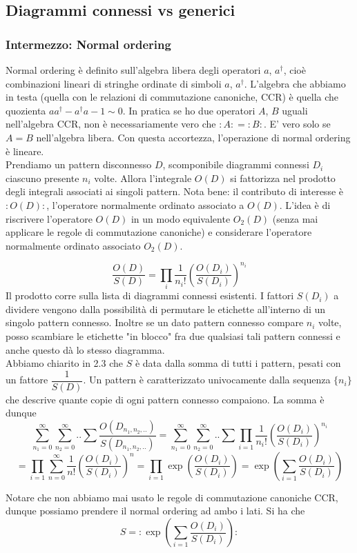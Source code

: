 \documentclass[]{article}
\begin{document}
\subsection{Diagrammi connessi vs generici}
\subsubsection*{Intermezzo: Normal ordering}
Normal ordering è definito sull'algebra libera degli operatori $a$, $a^\dagger$, cioè combinazioni lineari di stringhe ordinate di simboli $a$, $a^\dagger$. L'algebra che abbiamo in testa (quella con le relazioni di commutazione canoniche, CCR) è quella che quozienta $aa^\dagger-a^\dagger a -1 \sim 0$. In pratica se ho due operatori $A$, $B$ uguali nell'algebra CCR, non è necessariamente vero che $:A: = :B:$. E' vero solo se $A=B$ nell'algebra libera. Con questa accortezza, l'operazione di normal ordering è lineare.
\\

Prendiamo un pattern disconnesso $D$, scomponibile diagrammi connessi $D_i$ ciascuno presente $n_i$ volte. Allora l'integrale $O(D)$ si fattorizza nel prodotto degli integrali associati ai singoli pattern. Nota bene: il contributo di interesse è $:O(D):$, l'operatore normalmente ordinato associato a $O(D)$. L'idea è di riscrivere l'operatore $O(D)$ in un modo equivalente $O_2(D)$ (senza mai applicare le regole di commutazione canoniche) e considerare l'operatore normalmente ordinato associato $O_2(D)$.

\[ \dfrac{O(D)}{S(D)} = \prod_i \frac{1}{n_i!} \left( \dfrac{O(D_i)}{S(D_i)} \right)^{n_i} \]
Il prodotto corre sulla lista di diagrammi connessi esistenti. I fattori $S(D_i)$ a dividere vengono dalla possibilità di permutare le etichette all'interno di un singolo pattern connesso. Inoltre se un dato pattern connesso compare $n_i$ volte, posso scambiare le etichette "in blocco" fra due qualsiasi tali pattern connessi e anche questo dà lo stesso diagramma.
\\
Abbiamo chiarito in 2.3 che $S$ è data dalla somma di tutti i pattern, pesati con un fattore $\dfrac{1}{S(D)}$. Un pattern è caratterizzato univocamente dalla sequenza $\{n_i\}$ che descrive quante copie di ogni pattern connesso compaiono. La somma è dunque
\[ \sum_{n_1 = 0}^{\infty} \sum_{n_2 = 0}^{\infty} .. \sum \dfrac{O(D_{n_1,n_2,..})}{S(D_{n_1,n_2,..})} = \sum_{n_1 = 0}^{\infty} \sum_{n_2 = 0}^{\infty} .. \sum \prod_{i=1} \dfrac{1}{n_i!} \left( \dfrac{O(D_i)}{S(D_i)} \right)^{n_i} \]
\[ = \prod_{i=1} \sum_{n=0}^{\infty} \dfrac{1}{n!} \left( \dfrac{O(D_i)}{S(D_i)} \right)^{n} = \prod_{i=1} \exp\left( \dfrac{O(D_i)}{S(D_i)} \right) = \exp\left( \sum_{i=1} \dfrac{O(D_i)}{S(D_i)} \right) \]

Notare che non abbiamo mai usato le regole di commutazione canoniche CCR, dunque possiamo prendere il normal ordering ad ambo i lati. Si ha che
\[ S = :\exp\left( \sum_{i=1} \dfrac{O(D_i)}{S(D_i)} \right): \]
\end{document}
